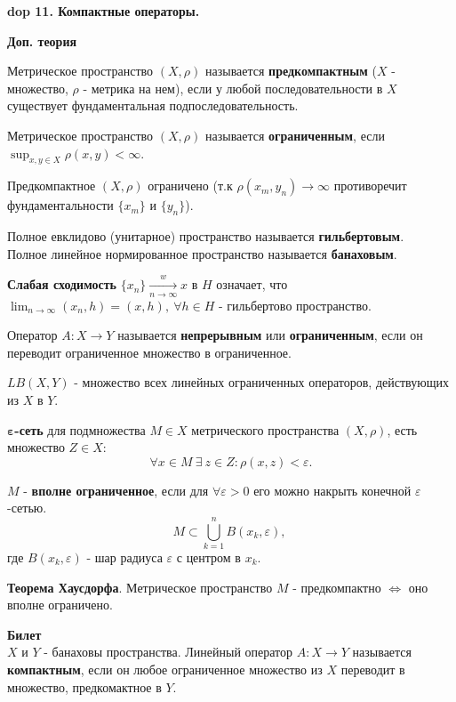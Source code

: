\setcounter{section}{4}
\setcounter{subsection}{11}
\setcounter{equation}{0}
\textbf{\LARGE dop 11. Компактные операторы.}

\textbf{Доп. теория}


Метрическое пространство $(X,\rho)$ называется \textbf{предкомпактным} ($X$ - множество, $\rho$ - метрика на нем), если у любой последовательности в $X$ существует фундаментальная подпоследовательность.
\bigbreak

Метрическое пространство $(X,\rho)$ называется \textbf{ограниченным}, если $\sup_{x,y \in X}{\rho (x,y)} < \infty$.

Предкомпактное $(X,\rho)$ ограничено (т.к $\rho(x_m,y_n) \rightarrow \infty$ противоречит фундаментальности $\{x_m\}$ и $\{y_n\}$).
\bigbreak

Полное евклидово (унитарное) пространство называется \textbf{гильбертовым}. \\
Полное линейное нормированное пространство называется \textbf{банаховым}.
\bigbreak 

\textbf{Слабая сходимость} $\{x_n\} \xrightarrow[n \rightarrow \infty]{w} x$ в $H$ означает, что $\lim_{n \rightarrow \infty}{(x_n, h)} = (x, h), \ \forall h \in H$ - гильбертово пространство.
\bigbreak

Оператор $A:X \rightarrow Y$ называется \textbf{непрерывным} или \textbf{ограниченным}, если он переводит ограниченное множество в ограниченное.
\bigbreak



$LB(X,Y)$ - множество всех линейных ограниченных операторов, действующих из $X$ в $Y$.
\bigbreak

$\boldsymbol{\varepsilon}$\textbf{-сеть} для подмножества $M \in X$ метрического пространства $(X, \rho)$, есть множество $Z \in X:$
$$
    \forall x \in M \ \exists \ z \in Z: \rho(x,z) < \varepsilon.
$$

$M$ - \textbf{вполне ограниченное}, если для $\forall \varepsilon > 0$ его можно накрыть конечной $\varepsilon$-сетью. 
$$
    M \subset \bigcup_{k=1}^{n} B(x_k, \varepsilon), \ 
$$
где $B(x_k, \varepsilon)$ - шар радиуса $\varepsilon$ с центром в $x_k$.
\bigbreak

\textbf{Теорема Хаусдорфа}. Метрическое пространство $M$ - предкомпактно $\Leftrightarrow$ оно вполне ограничено.
\bigbreak

\textbf{Билет} \\

\mathLet $X$ и $Y$ - банаховы пространства. Линейный оператор $A: X \rightarrow Y$ называется \textbf{компактным}, если он любое ограниченное множество из $X$ переводит в множество, предкомактное в $Y$.
\bigbreak

